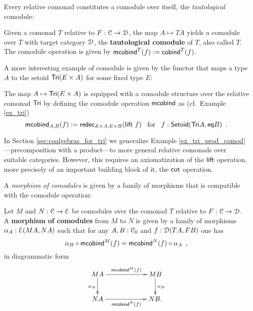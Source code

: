 \documentclass[a4paper,USenglish]{lipics}
\newcommand{\fat}[1]{\textbf{#1}}
\begin{document}
\noindent
Every relative comonad constitutes a comodule over itself, the \emph{tautological} comodule:

\begin{definition}
\label{def:tautological_comodule}
  Given a comonad $T$ relative to $F:\C\to\D$, the map $A \mapsto TA$ yields a comodule over $T$ 
  with target category $\D$, the \textbf{tautological comodule} of $T$, also called $T$.
  The comodule operation is given by
    $  \mcobind^T(f) := \cobind^T(f)$. 
\end{definition}

\noindent
A more interesting example of comodule is given by the functor that maps a type $A$ to the setoid $\Tri(E\times A)$
for some fixed type $E$:
\begin{example}\label{ex_tri_prod_comod}
   The map $A \mapsto \Tri(E\times A)$ is equipped with a comodule structure over the relative comonad $\Tri$ by
   defining the comodule operation $\mcobind$ as (cf.\ Example \ref{ex_tri})
     \[ \mcobind_{A,B} (f) := \redec_{E\times A, E\times B} (\extend~f) \enspace \text{ for } \enspace f : \Setoid(\Tri A, \eq B) \enspace . \]
\end{example}

In Section \ref{sec:coalgebras_for_tri} we generalize Example \ref{ex_tri_prod_comod}---precomposition with a product---to more general relative comonads over suitable categories.
However, this requires an axiomatization of the $\extend$ operation, more precisely of an important building block of it, the
$\cut$ operation.

A \emph{morphism of comodules} is given by a family of morphisms that is compatible with 
the comodule operation:

\begin{definition}
\label{def:morphism_of_comodules}
 Let $M$ and $N : \C \to \E$ be comodules over the comonad $T$ relative to  $F:\C \to \D$.
 A \fat{morphism of comodules} from $M$ to $N$ is given by a family of morphisms 
   $ \alpha_A:\E(MA,NA) $
 such that for any $A,B:\C_0$ and $f : \D(TA,FB)$ one has
 \[\comp{\mcobind^M(f)}{\alpha_B} = \comp{\alpha_A}{\mcobind^N(f)} \enspace, \]
 in diagrammatic form
 \[
  \begin{xy}
   \xymatrix@C=6em{
     MA  \ar[r]^{\mcobind^M(f)}  \ar[d]_{\alpha_A} & MB \ar[d]^{\alpha_B} \\
     NA  \ar[r]_{\mcobind^N(f)}  & NB.
   }
  \end{xy}
 \]

\end{definition}
\end{document}
